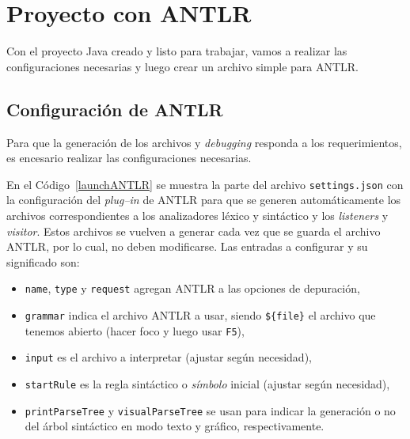 \section{Proyecto con ANTLR}
\label{proyecto_antlr}

Con el proyecto Java creado y listo para trabajar, vamos a realizar las configuraciones necesarias y luego crear un archivo  simple para ANTLR.

\subsection{Configuración de ANTLR}
\label{conf_antlr}

Para que la generación de los archivos y \emph{debugging} responda a los requerimientos, es encesario realizar las configuraciones necesarias.



En el Código~\ref{launchANTLR} se muestra la parte del archivo \verb|settings.json| con la configuración del \emph{plug--in} de ANTLR para que se generen automáticamente los archivos correspondientes a los analizadores léxico y sintáctico y los \emph{listeners} y \emph{visitor}.  Estos archivos se vuelven a generar cada vez que se guarda el archivo ANTLR, por lo cual, no deben modificarse.  Las entradas a configurar y su significado son:
\begin{itemize}
	\item \verb|name|, \verb|type| y \verb|request| agregan ANTLR a las opciones de depuración,
	\item \verb|grammar| indica el archivo ANTLR a usar, siendo \verb|${file}| el archivo que tenemos abierto (hacer foco y luego usar \verb|F5|),
	\item \verb|input| es el archivo a interpretar (ajustar según necesidad),
	\item \verb|startRule| es la regla sintáctico o \emph{símbolo} inicial (ajustar según necesidad),
	\item \verb|printParseTree| y \verb|visualParseTree| se usan para indicar la generación o no del árbol sintáctico en modo texto y gráfico, respectivamente.
\end{itemize}

\ifx\python\undefined

\else

\fi

